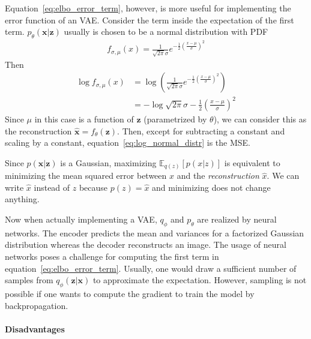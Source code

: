 Equation~\ref{eq:elbo_error_term}, however, is more useful for implementing the error function of an \ac{VAE}.
Consider the term inside the expectation of the first term.
$p_\theta(\bm{x}|\bm{z})$ usually is chosen to be a normal distribution with \ac{PDF}
\begin{align}
    f_{\sigma,\mu}(x) = \frac{1}{\sqrt{2\pi}\sigma}e^{-\frac{1}{2}\left( \frac{x-\mu}{\sigma} \right)^2}
\end{align}
Then
\begin{align}
    \log f_{\sigma,\mu}(x) &= \log \left( \frac{1}{\sqrt{2\pi}\sigma}e^{-\frac{1}{2}\left( \frac{x-\mu}{\sigma} \right)^2} \right)\\
    &= - \log \sqrt{2\pi}\sigma -\frac{1}{2}\left( \frac{x-\mu}{\sigma} \right)^2 \label{eq:log_normal_distr}
\end{align}
Since $\mu$ in this case is a function of $\bm{z}$ (parametrized by $\theta$), we can consider this as the reconstruction $\hat{\bm{x}} = f_\theta(\bm{z})$.
Then, except for subtracting a constant and scaling by a constant, equation~\ref{eq:log_normal_distr} is the \ac{MSE}.

Since $p(\bm{x}|\bm{z})$ is a Gaussian, maximizing $\mathbb{E}_{q(z)} \left[ p(x|z) \right]$ is equivalent to minimizing the mean squared error between $x$ and the \textit{reconstruction} $\hat{x}$.
We can write $\hat{x}$ instead of $z$ because $p(z) = \hat{x}$ and minimizing does not change anything.

Now when actually implementing a \ac{VAE}, $q_\phi$ and $p_\theta$ are realized by neural networks.
The encoder predicts the mean and variances for a factorized Gaussian distribution whereas the decoder reconstructs an image.
The usage of neural networks poses a challenge for computing the first term in equation~\ref{eq:elbo_error_term}.
Usually, one would draw a sufficient number of samples from $q_\phi(\bm{z}|\bm{x})$ to approximate the expectation.
However, sampling is not possible if one wants to compute the gradient to train the model by backpropagation.

\paragraph{Disadvantages}

